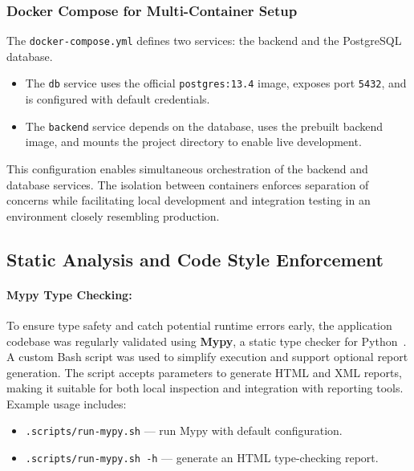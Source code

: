 \subsubsection{Docker Compose for Multi-Container Setup}

The \texttt{docker-compose.yml} defines two services: the backend and the PostgreSQL database.

\begin{itemize}
    \item The \texttt{db} service uses the official \texttt{postgres:13.4} image, exposes port \texttt{5432}, and is configured with default credentials.
    \item The \texttt{backend} service depends on the database, uses the prebuilt backend image, and mounts the project directory to enable live development.
\end{itemize}

This configuration enables simultaneous orchestration of the backend and database services. The isolation between containers enforces separation of concerns while facilitating local development and integration testing in an environment closely resembling production.

\subsection{Static Analysis and Code Style Enforcement}

\paragraph{Mypy Type Checking:}
To ensure type safety and catch potential runtime errors early, the application codebase was regularly validated using \textbf{Mypy}, a static type checker for Python~\cite{mypy}. A custom Bash script was used to simplify execution and support optional report generation. The script accepts parameters to generate HTML and XML reports, making it suitable for both local inspection and integration with reporting tools. Example usage includes:

\begin{itemize}
  \item \texttt{.scripts/run-mypy.sh} — run Mypy with default configuration.
  \item \texttt{.scripts/run-mypy.sh -h} — generate an HTML type-checking report.
\end{itemize}

